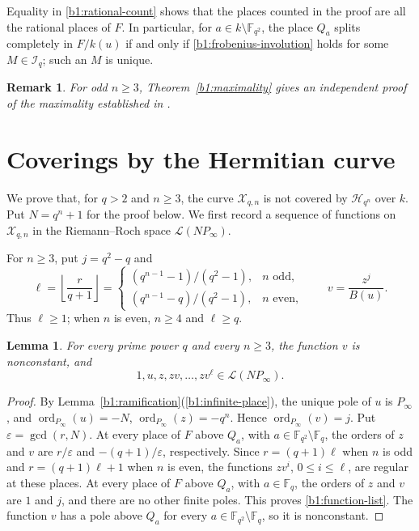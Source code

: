 \documentclass[10pt,a4paper]{amsart}
\numberwithin{equation}{section}
\newcommand{\F}{\mathbb F}
\newtheorem{lemma}[theorem]{Lemma}
\newtheorem{remark}[theorem]{Remark}
\begin{document}
Equality in \eqref{b1:rational-count} shows that the places counted
in the proof are all the rational places of \(F\).
In particular, for \(a\in k\setminus\F_{q^2}\), the place \(Q_a\)
splits completely in \(F/k(u)\) if and only if
\eqref{b1:frobenius-involution} holds for some
\(M\in\mathcal I_q\); such an \(M\) is unique.

\begin{remark}
\label{b1:bm-maximality}
For odd \(n\ge3\), Theorem~\ref{b1:maximality} gives an independent
proof of the maximality established in \cite[Theorem~3.9]{BM2018}.
\end{remark}


\section{Coverings by the Hermitian curve}
\label{b1:noncover-section}

We prove that, for \(q>2\) and \(n\ge3\), the curve
\(\mathcal X_{q,n}\) is not covered by \(\mathcal H_{q^n}\) over
\(k\). Put \(N=q^n+1\) for the proof below. We first record a
sequence of functions on \(\mathcal X_{q,n}\) in the
Riemann--Roch space \(\mathcal L(NP_\infty)\).

For \(n\ge3\), put \(j=q^2-q\) and
\begin{equation}
\label{b1:ell}
 \ell=\left\lfloor\frac{r}{q+1}\right\rfloor
 =\begin{cases}
 (q^{n-1}-1)/(q^2-1),&n\text{ odd},\\
 (q^{n-1}-q)/(q^2-1),&n\text{ even},
 \end{cases}
 \qquad v=\frac{z^j}{B(u)}.
\end{equation}
Thus \(\ell\ge1\); when \(n\) is even, \(n\ge4\) and
\(\ell\ge q\).

\begin{lemma}
\label{b1:pole-functions}
For every prime power \(q\) and every \(n\ge3\), the function \(v\)
is nonconstant, and
\begin{equation}
\label{b1:function-list}
 1,u,z,zv,\ldots,zv^\ell\in\mathcal L(NP_\infty).
\end{equation}
\end{lemma}

\begin{proof}
By Lemma~\ref{b1:ramification}(\ref{b1:infinite-place}), the unique pole of \(u\) is
\(P_\infty\), and
\(\operatorname{ord}_{P_\infty}(u)=-N\),
\(\operatorname{ord}_{P_\infty}(z)=-q^n\).  Hence
\(\operatorname{ord}_{P_\infty}(v)=j\).
Put \(\varepsilon=\gcd(r,N)\). At every place of \(F\) above
\(Q_a\), with \(a\in\F_{q^2}\setminus\F_q\),
the orders of \(z\) and \(v\) are \(r/\varepsilon\) and
\(-(q+1)/\varepsilon\), respectively.  Since
\(r=(q+1)\ell\) when \(n\) is odd and
\(r=(q+1)\ell+1\) when \(n\) is even, the functions
\(zv^i\), \(0\le i\le\ell\), are regular at these places.
At every place of \(F\) above \(Q_a\), with \(a\in\F_q\), the orders of \(z\) and
\(v\) are \(1\) and \(j\), and there are no other finite poles.
This proves \eqref{b1:function-list}. The function \(v\) has a pole
above \(Q_a\) for every \(a\in\F_{q^2}\setminus\F_q\), so it is nonconstant.
\end{proof}
\end{document}
